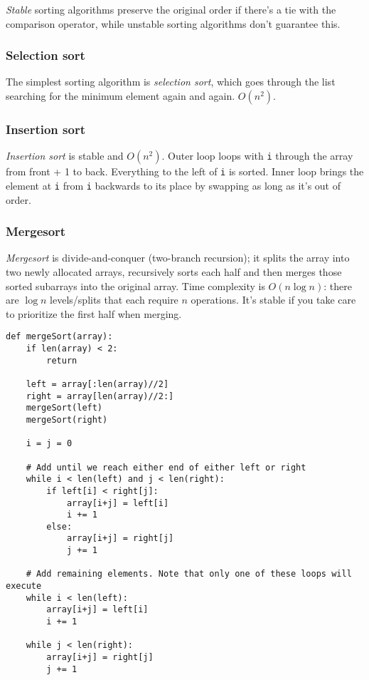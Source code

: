 \documentclass[8pt, table, xcdraw]{article}%
\begin{document}
\emph{Stable} sorting algorithms preserve the original order if there's a tie with the comparison operator, while unstable sorting algorithms don't guarantee this.

\subsubsection{Selection sort}

The simplest sorting algorithm is \emph{selection sort}, which goes through the list searching for the minimum element again and again. $O(n^2)$.

\subsubsection{Insertion sort}

\emph{Insertion sort} is stable and $O(n^2)$. Outer loop loops with \lstinline{i} through the array from front + 1 to back. Everything to the left of \lstinline{i} is sorted. Inner loop brings the element at \lstinline{i} from \lstinline{i} backwards to its place by swapping as long as it's out of order.

\subsubsection{Mergesort}

\emph{Mergesort} is divide-and-conquer (two-branch recursion); it splits the array into two newly allocated arrays, recursively sorts each half and then merges those sorted subarrays into the original array. Time complexity is $O(n \log n)$: there are $\log n$ levels/splits that each require $n$ operations. It's stable if you take care to prioritize the first half when merging.

\begin{lstlisting}
def mergeSort(array):
    if len(array) < 2:
        return
    
    left = array[:len(array)//2]
    right = array[len(array)//2:]
    mergeSort(left)
    mergeSort(right)

    i = j = 0

    # Add until we reach either end of either left or right
    while i < len(left) and j < len(right):
        if left[i] < right[j]:
            array[i+j] = left[i]
            i += 1
        else:
            array[i+j] = right[j]
            j += 1

    # Add remaining elements. Note that only one of these loops will execute
    while i < len(left):
        array[i+j] = left[i]
        i += 1

    while j < len(right):
        array[i+j] = right[j]
        j += 1
\end{lstlisting}
\end{document}
